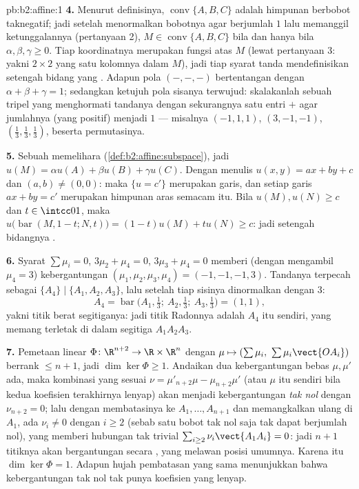 \begin{solution}{pb:b2:affine:1}
\textbf{4.} Menurut definisinya, $\operatorname{conv}\{A, B, C\}$ adalah
himpunan  berbobot taknegatif; jadi setelah menormalkan
bobotnya agar berjumlah $1$ lalu memanggil ketunggalannya (pertanyaan 2),
$M \in \operatorname{conv}\{A,B,C\}$ bila dan hanya bila $\alpha, \beta,
\gamma \geq 0$. Tiap koordinatnya merupakan fungsi  atas $M$
(lewat pertanyaan 3: yakni  $2\times2$ yang satu kolomnya 
dalam $M$), jadi tiap syarat tanda  mendefinisikan setengah
bidang yang . Adapun pola $(-,-,-)$ bertentangan dengan $\alpha + \beta
+ \gamma = 1$; sedangkan ketujuh pola sisanya terwujud:
skalakanlah sebuah tripel yang menghormati tandanya dengan sekurangnya satu
entri $+$ agar jumlahnya (yang positif) menjadi $1$ --- misalnya
$(-1, 1, 1)$, $(3, -1, -1)$, $(\frac13, \frac13, \frac13)$,
beserta permutasinya.

\textbf{5.} Sebuah  memelihara 
(\cref{def:b2:affine:subspace}), jadi $u(M) = \alpha u(A) +
\beta u(B) + \gamma u(C)$. Dengan menulis $u(x, y) = ax + by + c$
dan $(a, b) \neq (0,0)$: maka $\{u = c'\}$ merupakan garis, dan setiap
garis $ax + by = c'$ merupakan himpunan aras semacam itu. Bila $u(M), u(N) \geq
c$ dan $t \in \intcc01$, maka $u\bigl(\operatorname{bar}(M,
1-t; N, t)\bigr) = (1-t)u(M) + tu(N) \geq c$: jadi setengah bidangnya
.

\textbf{6.} Syarat $\sum\mu_i = 0$, $3\mu_2 + \mu_4 =
0$, $3\mu_3 + \mu_4 = 0$ memberi (dengan mengambil $\mu_4 = 3$)
kebergantungan $(\mu_1, \mu_2, \mu_3, \mu_4) = (-1, -1, -1, 3)$.
Tandanya terpecah sebagai $\{A_4\} \mid \{A_1, A_2, A_3\}$, lalu
setelah tiap sisinya dinormalkan dengan $3$:
\[
A_4 = \operatorname{bar}\bigl(A_1, \tfrac13;\ A_2, \tfrac13;\
A_3, \tfrac13\bigr) = (1,1),
\]
yakni titik berat segitiganya: jadi titik Radonnya adalah $A_4$
itu sendiri, yang memang terletak di dalam segitiga $A_1A_2A_3$.

\textbf{7.} Pemetaan linear $\Phi \colon \R^{n+2} \to \R
\times \R^n$ dengan $\mu \mapsto (\sum\mu_i,\
\sum\mu_i\vect{OA_i})$ berrank $\leq n + 1$, jadi $\dim\ker
\Phi \geq 1$. Andaikan dua kebergantungan bebas $\mu, \mu'$
ada, maka kombinasi yang sesuai $\nu = \mu'_{n+2}\mu -
\mu_{n+2}\mu'$ (atau $\mu$ itu sendiri bila kedua koefisien terakhirnya
lenyap) akan menjadi kebergantungan \emph{tak nol} dengan $\nu_{n+2}
= 0$; lalu dengan membatasinya ke $A_1, \dots, A_{n+1}$ dan memangkalkan ulang di
$A_1$, ada $\nu_i \neq 0$ dengan $i \geq 2$ (sebab satu bobot tak nol
saja tak dapat berjumlah nol), yang memberi hubungan tak trivial
$\sum_{i\geq2}\nu_i\vect{A_1A_i} = 0$: jadi $n+1$ titiknya akan
bergantungan secara \omterm{def:b2:affine:subspace}{afin}, yang melawan posisi umumnya. Karena itu $\dim\ker
\Phi = 1$. Adapun hujah pembatasan yang sama menunjukkan bahwa kebergantungan
tak nol tak punya koefisien yang lenyap.


\end{solution}
